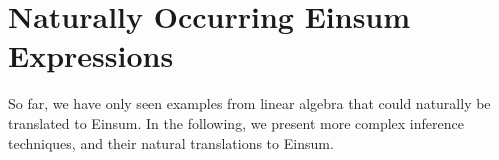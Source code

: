 \chapter{Naturally Occurring Einsum Expressions}

So far, we have only seen examples from linear algebra that could naturally be translated to Einsum.
In the following, we present more complex inference techniques, and their natural translations to Einsum.




